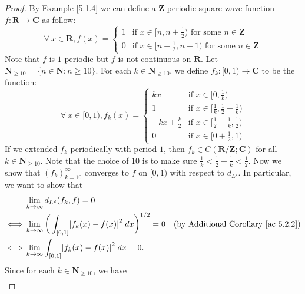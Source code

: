 \begin{proof}
    By Example \ref{5.1.4} we can define a \(\mathbf{Z}\)-periodic square wave function \(f : \mathbf{R} \to \mathbf{C}\) as follow:
    \[
        \forall\ x \in \mathbf{R}, f(x) = \begin{cases}
            1 & \text{if } x \in [n, n + \frac{1}{2}) \text{ for some } n \in \mathbf{Z}     \\
            0 & \text{if } x \in [n + \frac{1}{2}, n + 1) \text{ for some } n \in \mathbf{Z}
        \end{cases}
    \]
    Note that \(f\) is \(1\)-periodic but \(f\) is not continuous on \(\mathbf{R}\).
    Let \(\mathbf{N}_{\geq 10} = \{n \in \mathbf{N} : n \geq 10\}\).
    For each \(k \in \mathbf{N}_{\geq 10}\), we define \(f_k : [0, 1) \to \mathbf{C}\) to be the function:
    \[
        \forall\ x \in [0, 1), f_k(x) = \begin{cases}
            kx                & \text{if } x \in [0, \frac{1}{k})                         \\
            1                 & \text{if } x \in [\frac{1}{k}, \frac{1}{2} - \frac{1}{k}) \\
            -kx + \frac{k}{2} & \text{if } x \in [\frac{1}{2} - \frac{1}{k}, \frac{1}{2}) \\
            0                 & \text{if } x \in [0 + \frac{1}{2}, 1)
        \end{cases}
    \]
    If we extended \(f_k\) periodically with period \(1\), then \(f_k \in C(\mathbf{R} / \mathbf{Z} ; \mathbf{C})\) for all \(k \in \mathbf{N}_{\geq 10}\).
    Note that the choice of \(10\) is to make sure \(\frac{1}{k} < \frac{1}{2} - \frac{1}{k} < \frac{1}{2}\).
    Now we show that \((f_k)_{k = 10}^\infty\) converges to \(f\) on \([0, 1)\) with respect to \(d_{L^2}\).
    In particular, we want to show that
    \begin{align*}
             & \lim_{k \to \infty} d_{L^2}(f_k, f) = 0                                                                                                  \\
        \iff & \lim_{k \to \infty} \bigg(\int_{[0, 1]} \abs*{f_k(x) - f(x)}^2 \; dx\bigg)^{1 / 2} = 0 & \text{(by Additional Corollary \ref{ac 5.2.2})} \\
        \iff & \lim_{k \to \infty} \int_{[0, 1]} \abs*{f_k(x) - f(x)}^2 \; dx = 0.
    \end{align*}
    Since for each \(k \in \mathbf{N}_{\geq 10}\), we have
    \begin{align*}

\end{align*}
\end{proof}
